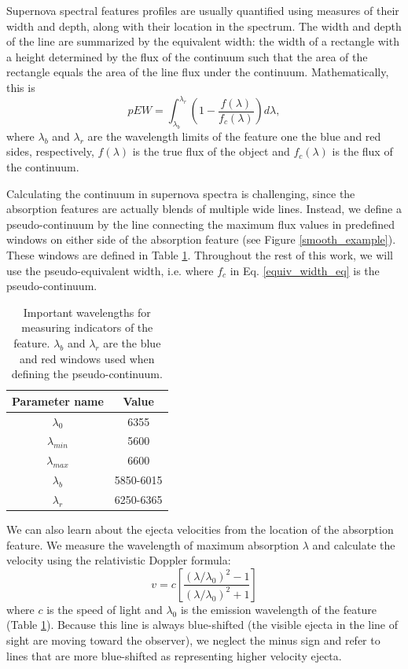 Supernova spectral features profiles are usually quantified using measures of their width and depth, along with their location in the spectrum. The width and depth of the line are summarized by the equivalent width: the width of a rectangle with a height determined by the flux of the continuum such that the area of the rectangle equals the area of the line flux under the continuum. Mathematically, this is
\begin{equation}
    pEW = \displaystyle\int_{\lambda_b}^{\lambda_r}
    \left(1-\frac{f(\lambda)}{f_c(\lambda)}\right)d\lambda,
    \label{equiv_width_eq}
\end{equation}
where $\lambda_b$ and $\lambda_r$ are the wavelength limits of the feature one the blue and red sides, respectively, $f(\lambda)$ is the true flux of the object and $f_c(\lambda)$ is the flux of the continuum.

Calculating the continuum in supernova spectra is challenging, since the absorption features are actually blends of multiple wide lines. Instead, we define a pseudo-continuum by the line connecting the maximum flux values in predefined windows on either side of the absorption feature (see Figure \ref{smooth_example}). These windows are defined in Table \ref{wavelength_ranges}. Throughout the rest of this work, we will use the pseudo-equivalent width, i.e. where $f_c$ in Eq. \ref{equiv_width_eq} is the pseudo-continuum.

\begin{table}[htbp]
    \centering
    \begin{tabular}{cc}\toprule
         Parameter name & Value \\\midrule
         $\lambda_0$ & 6355 \\
         $\lambda_{min}$ & 5600 \\
         $\lambda_{max}$ & 6600 \\
         $\lambda_b$ & 5850-6015 \\
         $\lambda_r$ & 6250-6365 \\\bottomrule
    \end{tabular}
    \caption{Important wavelengths for measuring indicators of the \siliconii{} feature. $\lambda_b$ and $\lambda_r$ are the blue and red windows used when defining the pseudo-continuum.}
    \label{wavelength_ranges}
\end{table}

We can also learn about the ejecta velocities from the location of the absorption feature. We measure the wavelength of maximum absorption $\lambda$ and calculate the velocity using the relativistic Doppler formula:
\begin{equation}
v = c\left[\frac{(\lambda/\lambda_0)^2 -1}{(\lambda/\lambda_0)^2 +1}\right]
\label{doppler}
\end{equation}
where $c$ is the speed of light and $\lambda_0$ is the emission wavelength of the feature (Table \ref{wavelength_ranges}). Because this line is always blue-shifted (the visible ejecta in the line of sight are moving toward the observer), we neglect the minus sign and refer to lines that are more blue-shifted as representing higher velocity ejecta.

